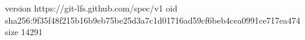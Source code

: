 version https://git-lfs.github.com/spec/v1
oid sha256:9f35f48f215b16b9eb75be25d3a7c1d01716ad59cf6beb4cea0991ce717ea474
size 14291
